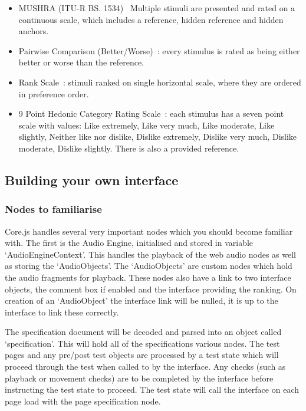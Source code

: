 \documentclass[11pt, oneside]{article}   	%
\begin{document}
\begin{itemize}
			\item MUSHRA (ITU-R BS. 1534)~\cite{recommendation20031534}  Multiple stimuli are presented and rated on a continuous scale, which includes a reference, hidden reference and hidden anchors.
			\item Pairwise Comparison (Better/Worse)~\cite{david1963method}: every stimulus is rated as being either better or worse than the reference.
			\item Rank Scale~\cite{pascoe1983evaluation}: stimuli ranked on single horizontal scale, where they are ordered in preference order.
			\item 9 Point Hedonic Category Rating Scale~\cite{peryam1952advanced}: each stimulus has a seven point scale with values: Like extremely, Like very much, Like moderate, Like slightly, Neither like nor dislike, Dislike extremely, Dislike very much, Dislike moderate, Dislike slightly. There is also a provided reference.
		\end{itemize}


	\subsection{Building your own interface}

		\subsubsection{Nodes to familiarise}
			Core.js handles several very important nodes which you should become familiar with. The first is the Audio Engine, initialised and stored in variable `AudioEngineContext'. This handles the playback of the web audio nodes as well as storing the `AudioObjects'. The `AudioObjects' are custom nodes which hold the audio fragments for playback. These nodes also have a link to two interface objects, the comment box if enabled and the interface providing the ranking. On creation of an `AudioObject' the interface link will be nulled, it is up to the interface to link these correctly.

			The specification document will be decoded and parsed into an object called `specification'. This will hold all of the specifications various nodes. The test pages and any pre/post test objects are processed by a test state which will proceed through the test when called to by the interface. Any checks (such as playback or movement checks) are to be completed by the interface before instructing the test state to proceed. The test state will call the interface on each page load with the page specification node.
\end{document}
